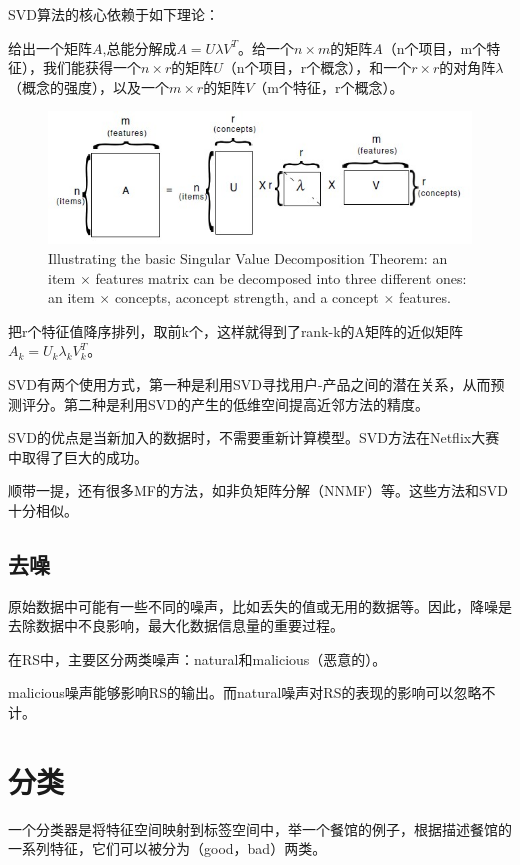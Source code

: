 \documentclass{article}
\begin{document}
 SVD算法的核心依赖于如下理论：

 给出一个矩阵$A$,总能分解成$A=U\lambda V^T$。给一个$n\times m$的矩阵$A$（n个项目，m个特征），我们能获得一个$n\times r$的矩阵$U$（n个项目，r个概念），和一个$r\times r$的对角阵$\lambda$（概念的强度），以及一个$m\times r$的矩阵$V$（m个特征，r个概念）。

 \begin{figure}[htb]
	  \begin{center}
	  	\includegraphics[scale=0.6]{f2.3.jpg}
	  	\caption{Illustrating the basic Singular Value Decomposition Theorem: an item $\times$ features matrix can be decomposed into three different ones: an item $\times$ concepts, aconcept strength, and a concept $\times$ features.}
	  \end{center}
 \end{figure}
把r个特征值降序排列，取前k个，这样就得到了rank-k的A矩阵的近似矩阵$A_k=U_k\lambda_kV_k^T$。
 
SVD有两个使用方式，第一种是利用SVD寻找用户-产品之间的潜在关系，从而预测评分。第二种是利用SVD的产生的低维空间提高近邻方法的精度。

SVD的优点是当新加入的数据时，不需要重新计算模型。SVD方法在Netflix大赛中取得了巨大的成功。

顺带一提，还有很多MF的方法，如非负矩阵分解（NNMF）等。这些方法和SVD十分相似。

\subsection{去噪}
原始数据中可能有一些不同的噪声，比如丢失的值或无用的数据等。因此，降噪是去除数据中不良影响，最大化数据信息量的重要过程。

在RS中，主要区分两类噪声：natural和malicious（恶意的）。

malicious噪声能够影响RS的输出。而natural噪声对RS的表现的影响可以忽略不计。

\section{分类}
一个分类器是将特征空间映射到标签空间中，举一个餐馆的例子，根据描述餐馆的一系列特征，它们可以被分为（good，bad）两类。
\end{document}
